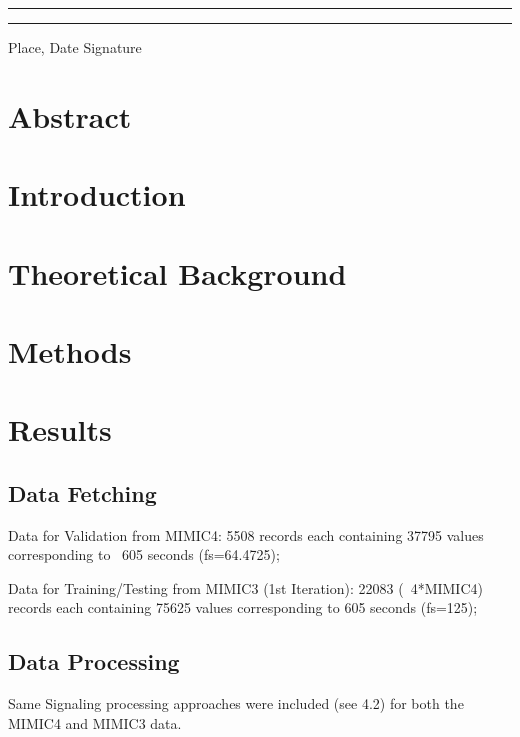\documentclass[12pt, bibliography=totoc]{scrartcl}
\begin{document}
    \rule{4cm}{0.5mm} \tab \rule{4cm}{0.5mm}

    Place, Date \tab Signature

    \newpage

    \tableofcontents

    \newpage
    \onehalfspacing


    \section{Abstract}\label{sec:abstract}


    \section{Introduction}
    \label{sec:introduction}
    


    \section{Theoretical Background}
    \label{sec:background}
    


    \section{Methods}
    \label{sec:methods}
    

    \section{Results}
    \label{sec:results}

    \subsection{Data Fetching}
    \label{subsec:data_fetching}

    Data for Validation from MIMIC4:
    5508 records each containing 37795 values corresponding to ~605 seconds (fs=64.4725);

    Data for Training/Testing from MIMIC3 (1st Iteration):
    22083 (~4*MIMIC4) records each containing 75625 values corresponding to 605 seconds (fs=125);

    \subsection{Data Processing}
    \label{subsec:data_processing}

    Same Signaling processing approaches were included (see 4.2) for both the MIMIC4 and MIMIC3 data.
\end{document}
